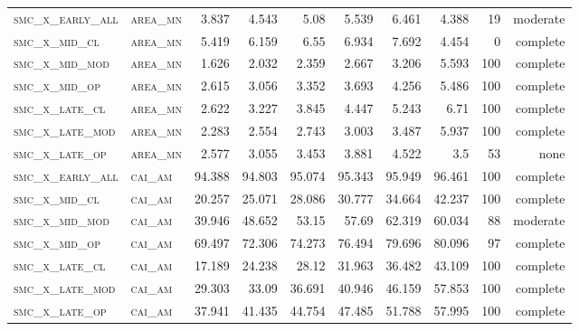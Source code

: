 \begin{landscape}
\begin{center}
\begin{footnotesize}
\begin{longtable}{llrrrrr|rrr}
\textsc{smc\_x\_early\_all} & \textsc{area\_mn  }   & 3.837      & 4.543      & 5.08       & 5.539      & 6.461      & 4.388      & 19    & moderate   \\
\textsc{smc\_x\_mid\_cl   } & \textsc{area\_mn  }   & 5.419      & 6.159      & 6.55       & 6.934      & 7.692      & 4.454      & 0     & complete   \\
\textsc{smc\_x\_mid\_mod  } & \textsc{area\_mn  }   & 1.626      & 2.032      & 2.359      & 2.667      & 3.206      & 5.593      & 100   & complete   \\
\textsc{smc\_x\_mid\_op   } & \textsc{area\_mn  }   & 2.615      & 3.056      & 3.352      & 3.693      & 4.256      & 5.486      & 100   & complete   \\
\textsc{smc\_x\_late\_cl  } & \textsc{area\_mn  }   & 2.622      & 3.227      & 3.845      & 4.447      & 5.243      & 6.71       & 100   & complete   \\
\textsc{smc\_x\_late\_mod } & \textsc{area\_mn  }   & 2.283      & 2.554      & 2.743      & 3.003      & 3.487      & 5.937      & 100   & complete   \\
\textsc{smc\_x\_late\_op  } & \textsc{area\_mn  }   & 2.577      & 3.055      & 3.453      & 3.881      & 4.522      & 3.5        & 53    & none   \\
\textsc{smc\_x\_early\_all} & \textsc{cai\_am   }   & 94.388     & 94.803     & 95.074     & 95.343     & 95.949     & 96.461     & 100   & complete   \\
\textsc{smc\_x\_mid\_cl   } & \textsc{cai\_am   }   & 20.257     & 25.071     & 28.086     & 30.777     & 34.664     & 42.237     & 100   & complete   \\
\textsc{smc\_x\_mid\_mod  } & \textsc{cai\_am   }   & 39.946     & 48.652     & 53.15      & 57.69      & 62.319     & 60.034     & 88    & moderate   \\
\textsc{smc\_x\_mid\_op   } & \textsc{cai\_am   }   & 69.497     & 72.306     & 74.273     & 76.494     & 79.696     & 80.096     & 97    & complete   \\
\textsc{smc\_x\_late\_cl  } & \textsc{cai\_am   }   & 17.189     & 24.238     & 28.12      & 31.963     & 36.482     & 43.109     & 100   & complete   \\
\textsc{smc\_x\_late\_mod } & \textsc{cai\_am   }   & 29.303     & 33.09      & 36.691     & 40.946     & 46.159     & 57.853     & 100   & complete   \\
\textsc{smc\_x\_late\_op  } & \textsc{cai\_am   }   & 37.941     & 41.435     & 44.754     & 47.485     & 51.788     & 57.995     & 100   & complete   \\

\end{longtable}
\end{footnotesize}
\end{center}
\end{landscape}
